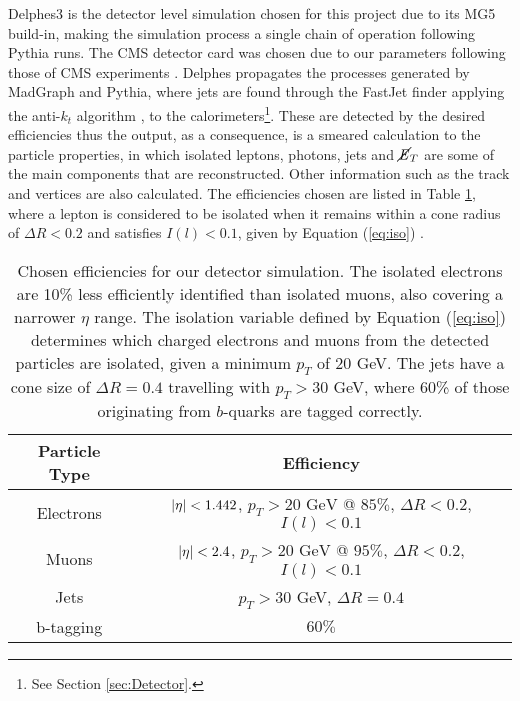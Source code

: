 Delphes3 \cite{de2014delphes} is the detector level simulation chosen for this project due to its MG5 build-in, making the simulation process a single chain of operation following Pythia runs. The CMS detector card was chosen due to our parameters following those of CMS experiments \cite{cms2019search, cms2016searches, cms2017search}. Delphes propagates the processes generated by MadGraph and Pythia, where jets are found through the FastJet finder \cite{cacciari2012fastjet} applying the anti-$k_t$ algorithm \cite{cacciari2008anti}, to the calorimeters\footnote{See Section \ref{sec:Detector}.}. These are detected by the desired efficiencies thus the output, as a consequence, is a smeared calculation to the particle properties, in which isolated leptons, photons, jets and $\cancel{\it{E}}_{T}$ are some of the main components that are reconstructed. Other information such as the track and vertices are also calculated. The efficiencies chosen are listed in Table \ref{tab:efficiencies}, where a lepton is considered to be isolated when it remains within a cone radius of $\Delta R <0.2$ and satisfies $I(l)<0.1$, given by Equation (\ref{eq:iso}) \cite{de2014delphes}. \\

\begin{table}[htbp]
    \centering
    \begin{tabular}{c|c}
    \toprule
    Particle Type & Efficiency \\
    \midrule
    \rowcolor{gray!6} Electrons & $\abs{\eta} < 1.442$, $p_T > 20\text{ GeV}$ @ $85\%$, $\Delta R <0.2$, $I(l) <0.1$\\
    Muons & $\abs{\eta} < 2.4$, $p_T > 20\text{ GeV}$ @ $95\%$, $\Delta R < 0.2$, $I(l) <0.1$\\
    \rowcolor{gray!6} Jets & $p_T>30$ GeV, $\Delta R = 0.4$\\
    b-tagging & $60\%$ \\
    \bottomrule
    \end{tabular}
    \caption{Chosen efficiencies for our detector simulation. The isolated electrons are 10\% less efficiently identified than isolated muons, also covering a narrower $\eta$ range. The isolation variable defined by Equation (\ref{eq:iso}) determines which charged electrons and muons from the detected particles are isolated, given a minimum $p_T$ of 20 GeV. The jets have a cone size of $\Delta R = 0.4$ travelling with $p_T>30$ GeV, where 60\% of those originating from $b$-quarks are tagged correctly.} 
    \label{tab:efficiencies}    
\end{table}

